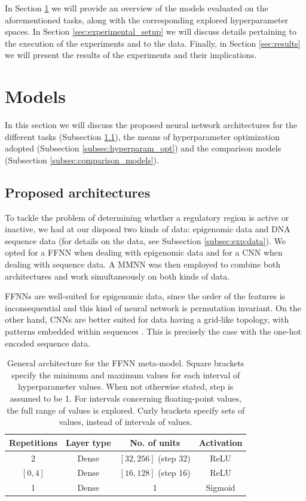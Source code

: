 \documentclass{article}
\begin{document}
In Section \ref{sec:models} we will provide an overview of the models evaluated on the aforementioned tasks, along with the corresponding explored hyperparameter spaces. In Section \ref{sec:experimental_setup} we will discuss details pertaining to the execution of the experiments and to the data. Finally, in Section \ref{sec:results} we will present the results of the experiments and their implications.

\section{Models}
\label{sec:models}

In this section we will discuss the proposed neural network architectures for the different tasks (Subsection \ref{subsec:proposed_architectures}), the means of hyperparameter optimization adopted (Subsection \ref{subsec:hyperparam_opt}) and the comparison models (Subsection \ref{subsec:comparison_models}).

\subsection{Proposed architectures}
\label{subsec:proposed_architectures}

To tackle the problem of determining whether a regulatory region is active or inactive, we had at our disposal two kinds of data: epigenomic data and DNA sequence data (for details on the data, see Subsection \ref{subsec:exp:data}). We opted for a FFNN when dealing with epigenomic data and for a CNN when dealing with sequence data. A MMNN was then employed to combine both architectures and work simultaneously on both kinds of data. 

FFNNs are well-suited for epigenomic data, since the order of the features is inconsequential and this kind of neural network is permutation invariant. On the other hand, CNNs are better suited for data having a grid-like topology, with patterns embedded within sequences \cite{goodfellow16}. This is precisely the case with the one-hot encoded sequence data.

\begin{table}
    \centering
    \begin{tabular}{cccc}
        \toprule
        Repetitions & Layer type & No. of units & Activation \\
        \midrule
        2 & Dense & $[32, 256]$ (step 32) & ReLU \\
        $[0, 4]$ & Dense & $[16, 128]$ (step 16) & ReLU \\
        1 & Dense & 1 & Sigmoid \\
        \bottomrule
    \end{tabular}
    \caption{General architecture for the FFNN meta-model. Square brackets specify the minimum and maximum values for each interval of hyperparameter values. When not otherwise stated, step is assumed to be 1. For intervals concerning floating-point values, the full range of values is explored. Curly brackets specify sets of values, instead of intervals of values.}
    \label{tab:models:ffnn_hp_arch}
\end{table}
\end{document}
